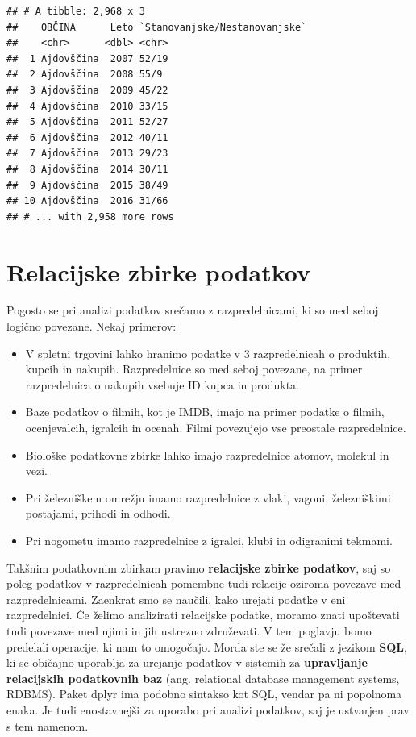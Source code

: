 \documentclass[
]{book}
\providecommand{\tightlist}{%
  \setlength{\itemsep}{0pt}\setlength{\parskip}{0pt}}
\begin{document}
\begin{verbatim}
## # A tibble: 2,968 x 3
##    OBČINA      Leto `Stanovanjske/Nestanovanjske`
##    <chr>      <dbl> <chr>                        
##  1 Ajdovščina  2007 52/19                        
##  2 Ajdovščina  2008 55/9                         
##  3 Ajdovščina  2009 45/22                        
##  4 Ajdovščina  2010 33/15                        
##  5 Ajdovščina  2011 52/27                        
##  6 Ajdovščina  2012 40/11                        
##  7 Ajdovščina  2013 29/23                        
##  8 Ajdovščina  2014 30/11                        
##  9 Ajdovščina  2015 38/49                        
## 10 Ajdovščina  2016 31/66                        
## # ... with 2,958 more rows
\end{verbatim}

\hypertarget{relacijske-zbirke-podatkov}{%
\section{Relacijske zbirke podatkov}\label{relacijske-zbirke-podatkov}}

Pogosto se pri analizi podatkov srečamo z razpredelnicami, ki so med seboj logično povezane. Nekaj primerov:

\begin{itemize}
\tightlist
\item
  V spletni trgovini lahko hranimo podatke v 3 razpredelnicah o produktih, kupcih in nakupih. Razpredelnice so med seboj povezane, na primer razpredelnica o nakupih vsebuje ID kupca in produkta.
\item
  Baze podatkov o filmih, kot je IMDB, imajo na primer podatke o filmih, ocenjevalcih, igralcih in ocenah. Filmi povezujejo vse preostale razpredelnice.
\item
  Biološke podatkovne zbirke lahko imajo razpredelnice atomov, molekul in vezi.
\item
  Pri železniškem omrežju imamo razpredelnice z vlaki, vagoni, železniškimi postajami, prihodi in odhodi.
\item
  Pri nogometu imamo razpredelnice z igralci, klubi in odigranimi tekmami.
\end{itemize}

Takšnim podatkovnim zbirkam pravimo \textbf{relacijske zbirke podatkov}, saj so poleg podatkov v razpredelnicah pomembne tudi relacije oziroma povezave med razpredelnicami. Zaenkrat smo se naučili, kako urejati podatke v eni razpredelnici. Če želimo analizirati relacijske podatke, moramo znati upoštevati tudi povezave med njimi in jih ustrezno združevati. V tem poglavju bomo predelali operacije, ki nam to omogočajo. Morda ste se že srečali z jezikom \textbf{SQL}, ki se običajno uporablja za urejanje podatkov v sistemih za \textbf{upravljanje relacijskih podatkovnih baz} (ang. relational database management systems, RDBMS). Paket dplyr ima podobno sintakso kot SQL, vendar pa ni popolnoma enaka. Je tudi enostavnejši za uporabo pri analizi podatkov, saj je ustvarjen prav s tem namenom.
\end{document}
